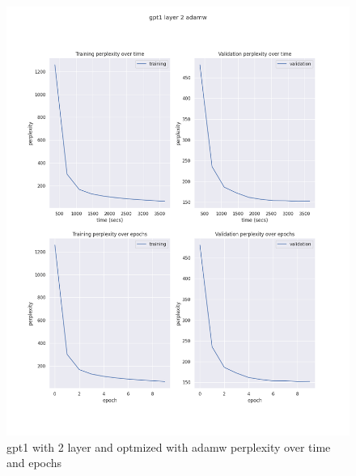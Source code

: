\documentclass[12pt]{article}
\theoremstyle{definition}
\begin{document}
\begin{figure}[H]
     \centering
     \includegraphics[scale=0.4]{gpt1_layer_2_adamw.png}
     \caption{gpt1 with 2 layer and optmized with adamw perplexity over time and epochs}
\end{figure}
\end{document}
